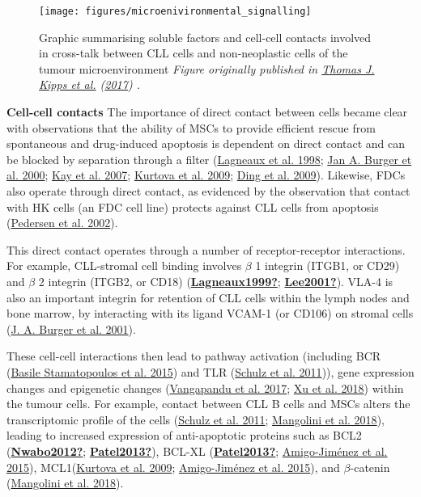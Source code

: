 \documentclass[11pt, a4paper, twosided]{book}
\begin{document}
\begin{figure}

{\centering \texttt{[image: figures/microenivironmental\_signalling]} 

}

\caption{Graphic summarising soluble factors and cell-cell contacts involved in cross-talk between CLL cells and non-neoplastic cells of the tumour microenvironment \emph{Figure originally published in \protect\hyperlink{ref-Kipps2017}{Thomas J. Kipps et al.} (\protect\hyperlink{ref-Kipps2017}{2017}) .}}\label{fig:microenvironmentSignalling}
\end{figure}
\textbf{Cell-cell contacts}
The importance of direct contact between cells became clear with observations that the ability of MSCs to provide efficient rescue from spontaneous and drug-induced apoptosis is dependent on direct contact and can be blocked by separation through a filter (\protect\hyperlink{ref-Lagneaux1998}{Lagneaux et al. 1998}; \protect\hyperlink{ref-Burger2000}{Jan A. Burger et al. 2000}; \protect\hyperlink{ref-Kay2007}{Kay et al. 2007}; \protect\hyperlink{ref-Kurtova2009}{Kurtova et al. 2009}; \protect\hyperlink{ref-Ding2009}{Ding et al. 2009}). Likewise, FDCs also operate through direct contact, as evidenced by the observation that contact with HK cells (an FDC cell line) protects against CLL cells from apoptosis (\protect\hyperlink{ref-Pedersen2002}{Pedersen et al. 2002}).

This direct contact operates through a number of receptor-receptor interactions. For example, CLL-stromal cell binding involves \(\beta\) 1 integrin (ITGB1, or CD29) and \(\beta\) 2 integrin (ITGB2, or CD18) (\protect\hyperlink{ref-Lagneaux1999}{\textbf{Lagneaux1999?}}; \protect\hyperlink{ref-Lee2001}{\textbf{Lee2001?}}). VLA-4 is also an important integrin for retention of CLL cells within the lymph nodes and bone marrow, by interacting with its ligand VCAM-1 (or CD106) on stromal cells (\protect\hyperlink{ref-Burger2001}{J. A. Burger et al. 2001}).

These cell-cell interactions then lead to pathway activation (including BCR (\protect\hyperlink{ref-Stamatopoulos2015}{Basile Stamatopoulos et al. 2015}) and TLR (\protect\hyperlink{ref-Schulz2011}{Schulz et al. 2011})), gene expression changes and epigenetic changes (\protect\hyperlink{ref-Vangapandu2017}{Vangapandu et al. 2017}; \protect\hyperlink{ref-Xu2018}{Xu et al. 2018}) within the tumour cells. For example, contact between CLL B cells and MSCs alters the transcriptomic profile of the cells (\protect\hyperlink{ref-Schulz2011}{Schulz et al. 2011}; \protect\hyperlink{ref-Mangolini2018}{Mangolini et al. 2018}), leading to increased expression of anti-apoptotic proteins such as BCL2 (\protect\hyperlink{ref-Nwabo2012}{\textbf{Nwabo2012?}}; \protect\hyperlink{ref-Patel2013}{\textbf{Patel2013?}}), BCL-XL (\protect\hyperlink{ref-Patel2013}{\textbf{Patel2013?}}; \protect\hyperlink{ref-AmigoJimenez2015}{Amigo-Jiménez et al. 2015}), MCL1(\protect\hyperlink{ref-Kurtova2009}{Kurtova et al. 2009}; \protect\hyperlink{ref-AmigoJimenez2015}{Amigo-Jiménez et al. 2015}), and \(\beta\)-catenin (\protect\hyperlink{ref-Mangolini2018}{Mangolini et al. 2018}).
\end{document}
